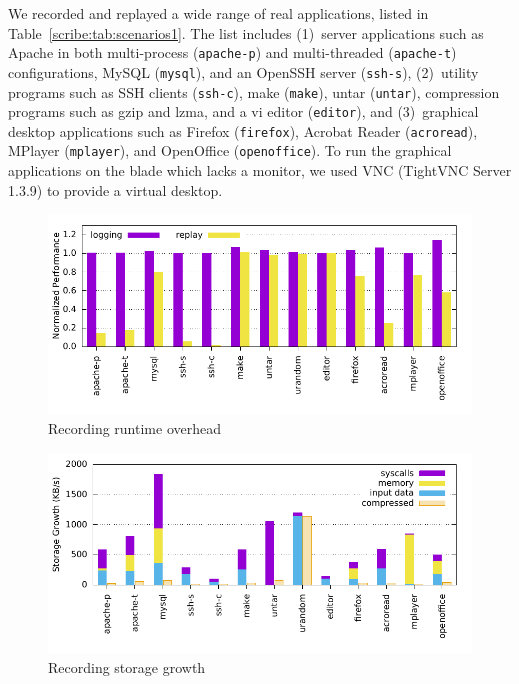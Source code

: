 We recorded and replayed a wide range of real applications, listed in
Table~\ref{scribe:tab:scenarios1}.
The list includes (1)~server applications
such as Apache in both multi-process ({\tt apache-p}) and multi-threaded
({\tt apache-t}) configurations, MySQL ({\tt mysql}), and an
OpenSSH server ({\tt ssh-s}), (2)~utility programs such as
SSH clients ({\tt ssh-c}), make ({\tt make}), untar ({\tt untar}),
compression programs such as gzip and lzma, and a vi editor
({\tt editor}), and (3)~graphical desktop applications such as
Firefox ({\tt firefox}), Acrobat Reader ({\tt acroread}), MPlayer
({\tt mplayer}), and OpenOffice ({\tt openoffice}). To run the graphical
applications on the blade which lacks a monitor, we used VNC
(TightVNC Server 1.3.9) to provide a virtual desktop. 


\begin{figure}[t]
  \centering
  \includegraphics[width=\linewidth]{figures/scribe/overhead}
  \vspace{-5em}
  \caption{Recording runtime overhead}
  \label{scribe:fig:overhead}
\end{figure}

\begin{figure}[t]
    \centering
    \includegraphics[width=\linewidth]{figures/scribe/storage}
  \vspace{-5em}
    \caption{Recording storage growth}
    \label{scribe:fig:storage}
\end{figure}


